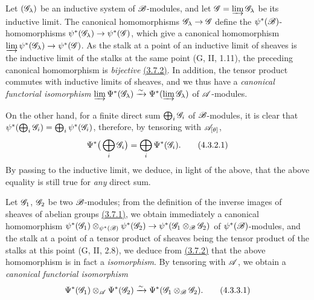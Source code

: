 \begin{env}[4.3.2]
\label{env-0.4.3.2}
Let $(\mathscr{G}_\lambda)$ be an inductive system of $\mathscr{B}$-modules, and let
$\mathscr{G}=\varinjlim\mathscr{G}_\lambda$ be its inductive limit. The canonical
homomorphisms $\mathscr{G}_\lambda\to\mathscr{G}$ define the
$\psi^*(\mathscr{B})$-homomorphisms $\psi^*(\mathscr{G}_\lambda)\to\psi^*(\mathscr{G})$, which
give a canonical homomorphism
$\varinjlim\psi^*(\mathscr{G}_\lambda)\to\psi^*(\mathscr{G})$. As the stalk at a point of
an inductive limit of sheaves is the inductive limit of the stalks at the same
point (G, II, 1.11), the preceding canonical homomorphism is {\em bijective}
\hyperref[env-0.3.7.2]{(3.7.2)}. In addition, the tensor product commutes with inductive
limits of sheaves, and we thus have a {\em canonical functorial isomorphism}
$\varinjlim\Psi^*(\mathscr{G}_\lambda)\xrightarrow{\sim}\Psi^*(\varinjlim\mathscr{G}_\lambda)$ of
$\mathscr{A}$-modules.

On the other hand, for a finite direct sum $\bigoplus_i\mathscr{G}_i$ of
$\mathscr{B}$-modules, it is clear that
$\psi^*(\bigoplus_i\mathscr{G}_i)=\bigoplus_i\psi^*(\mathscr{G}_i)$, therefore, by
tensoring with $\mathscr{A}_{[\theta]}$,
\[
  \Psi^*\big(\bigoplus_i\mathscr{G}_i\big)=\bigoplus_i\Psi^*(\mathscr{G}_i).
  \tag{4.3.2.1}
\]
By passing to the inductive limit, we deduce, in light of the above, that the
above equality is still true for {\em any} direct sum.
\end{env}

\begin{env}[4.3.3]
\label{env-0.4.3.3}
Let $\mathscr{G}_1$, $\mathscr{G}_2$ be two $\mathscr{B}$-modules; from the definition of the
inverse images of sheaves of abelian groups \hyperref[env-0.3.7.1]{(3.7.1)}, we obtain
immediately a canonical homomorphism
$\psi^*(\mathscr{G}_1)\otimes_{\psi^*(\mathscr{B})}\psi^*(\mathscr{G}_2)
  \to\psi^*(\mathscr{G}_1\otimes_\mathscr{B}\mathscr{G}_2)$ of $\psi^*(\mathscr{B})$-modules, and
the stalk at a point of a tensor product of sheaves being the tensor product of
the stalks at this point (G, II, 2.8), we deduce from \hyperref[env-0.3.7.2]{(3.7.2)} that the
above homomorphism is in fact a {\em isomorphism}. By tensoring with $\mathscr{A}$,
we obtain a {\em canonical functorial isomorphism}
\[
  \Psi^*(\mathscr{G}_1)\otimes_\mathscr{A}\Psi^*(\mathscr{G}_2)
  \xrightarrow{\sim}\Psi^*(\mathscr{G}_1\otimes_\mathscr{B}\mathscr{G}_2).
  \tag{4.3.3.1}
\]
\end{env}

